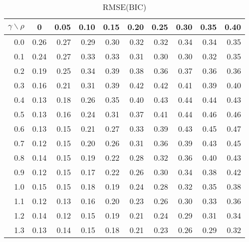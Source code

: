 \documentclass[12pt]{article}
\begin{document}
%
\begin{table}[!tbp]
\caption{RMSE(BIC)}
 \begin{center}
 \begin{tabular}{r|rrrrrrrrr}\hline\hline
\multicolumn{1}{c|}{$\gamma\backslash\rho$}&\multicolumn{1}{c}{0}&\multicolumn{1}{c}{0.05}&\multicolumn{1}{c}{0.10}&\multicolumn{1}{c}{0.15}&\multicolumn{1}{c}{0.20}&\multicolumn{1}{c}{0.25}&\multicolumn{1}{c}{0.30}&\multicolumn{1}{c}{0.35}&\multicolumn{1}{c}{0.40}\tabularnewline
\hline
0.0&0.26&0.27&0.29&0.30&0.32&0.32&0.34&0.34&0.35\tabularnewline
0.1&0.24&0.27&0.33&0.33&0.31&0.30&0.30&0.32&0.35\tabularnewline
0.2&0.19&0.25&0.34&0.39&0.38&0.36&0.37&0.36&0.36\tabularnewline
0.3&0.16&0.21&0.31&0.39&0.42&0.42&0.41&0.39&0.40\tabularnewline
0.4&0.13&0.18&0.26&0.35&0.40&0.43&0.44&0.44&0.43\tabularnewline
0.5&0.13&0.16&0.24&0.31&0.37&0.41&0.44&0.46&0.46\tabularnewline
0.6&0.13&0.15&0.21&0.27&0.33&0.39&0.43&0.45&0.47\tabularnewline
0.7&0.12&0.15&0.20&0.26&0.31&0.36&0.39&0.43&0.45\tabularnewline
0.8&0.14&0.15&0.19&0.22&0.28&0.32&0.36&0.40&0.43\tabularnewline
0.9&0.12&0.15&0.17&0.22&0.26&0.30&0.34&0.38&0.42\tabularnewline
1.0&0.15&0.15&0.18&0.19&0.24&0.28&0.32&0.35&0.38\tabularnewline
1.1&0.12&0.13&0.16&0.20&0.23&0.26&0.30&0.33&0.36\tabularnewline
1.2&0.14&0.12&0.15&0.19&0.21&0.24&0.29&0.31&0.34\tabularnewline
1.3&0.13&0.14&0.15&0.18&0.21&0.23&0.26&0.29&0.32\tabularnewline
\hline
\end{tabular}

\end{center}

\end{table}
\end{document}
